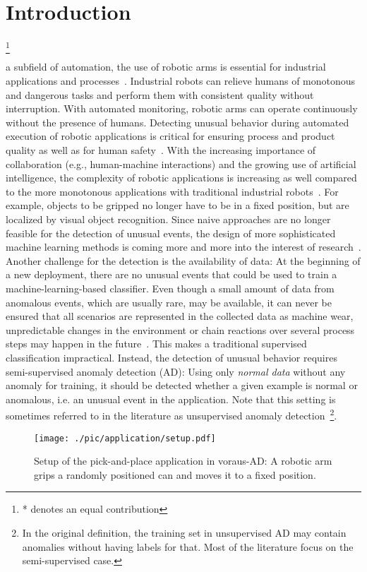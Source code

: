 \documentclass[journal]{IEEEtran}
\newcommand\blfootnote[1]{\begingroup
  \renewcommand\thefootnote{}\footnote{#1}\addtocounter{footnote}{-1}\endgroup
}
\begin{document}
\section{Introduction}
\blfootnote{* denotes an equal contribution}
 a subfield of automation, the use of robotic arms is essential for industrial applications and processes~\cite{bahrin2016industry}.
Industrial robots can relieve humans of monotonous and dangerous tasks and perform them with consistent quality without interruption.
With automated monitoring, robotic arms can operate continuously without the presence of humans.
Detecting unusual behavior during automated execution of robotic applications is critical for ensuring process and product quality as well as for human safety~\cite{vasic2013safety}.
With the increasing importance of collaboration (e.g., human-machine interactions) and the growing use of artificial intelligence, the complexity of robotic applications is increasing as well compared to the more monotonous applications with traditional industrial robots~\cite{kragic2018interactive}.
For example, objects to be gripped no longer have to be in a fixed position, but are localized by visual object recognition.
Since naive approaches are no longer feasible for the detection of unusual events, the design of more sophisticated machine learning methods is coming more and more into the interest of research~\cite{hornung2014model, swvae, rnn_vae, romeres2019anomaly, khalastchi2015online, zhang2021robot}.
Another challenge for the detection is the availability of data:
At the beginning of a new deployment, there are no unusual events that could be used to train a machine-learning-based classifier.
Even though a small amount of data from anomalous events, which are usually rare, may be available, it can never be ensured that all scenarios are represented in the collected data as machine wear, unpredictable changes in the environment or chain reactions over several process steps may happen in the future~\cite{mvtec}.
This makes a traditional supervised classification impractical.
Instead, the detection of unusual behavior requires semi-supervised anomaly detection (AD): 
Using only \textit{normal data} without any anomaly for training, it should be detected whether a given example is normal or anomalous, i.e. an unusual event in the application.
Note that this setting is sometimes referred to in the literature as unsupervised anomaly detection~\cite{mvtec3d, st_bergmann2, memae}\footnote{In the original definition, the training set in unsupervised AD may contain anomalies without having labels for that. Most of the literature focus on the semi-supervised case.}.
\begin{figure}
  \centering
  \texttt{[image: ./pic/application/setup.pdf]}
  \caption{Setup of the pick-and-place application in voraus-AD: A {robotic arm} grips a randomly positioned can and moves it to a fixed position.}
  \label{fig:setup}
  \vspace{-5mm}
\end{figure}
\end{document}
